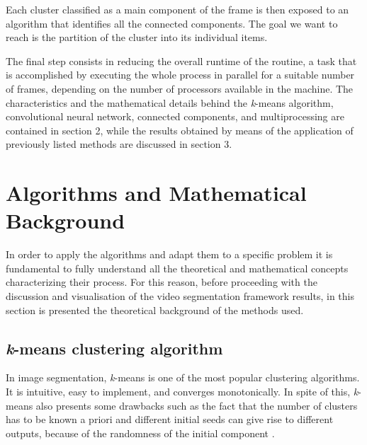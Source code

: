\documentclass{usiinftr}
\begin{document}
 Each cluster classified as a main component of the frame is then exposed to an algorithm that identifies all the connected components. The goal we want to reach is the partition of the cluster into its individual items.
 
 The final step consists in reducing the overall runtime of the routine, a task that is accomplished by executing the whole process in parallel for a suitable number of frames, depending on the number of processors available in the machine.
 The characteristics and the mathematical details behind the \textit{k}-means algorithm, convolutional neural network, connected components, and multiprocessing are contained in section 2, while the results obtained by means of the application of previously listed methods are discussed in section 3.
 
\section{Algorithms and Mathematical Background}
In order to apply the algorithms and adapt them to a specific problem it is fundamental to fully understand all the theoretical and mathematical concepts characterizing their process. For this reason, before proceeding with the discussion and visualisation of the video segmentation framework results, in this section is presented the theoretical background of the methods used.

\subsection{\textit{k}-means clustering algorithm} 
In image segmentation, \textit{k}-means is one of the most popular clustering algorithms. It is intuitive, easy to implement, and converges monotonically. In spite of this, \textit{k}-means also presents some drawbacks such as the fact that the number of clusters has to be known a priori and different initial seeds can give rise to different outputs, because of the randomness of the initial component \cite{10}.
\end{document}

